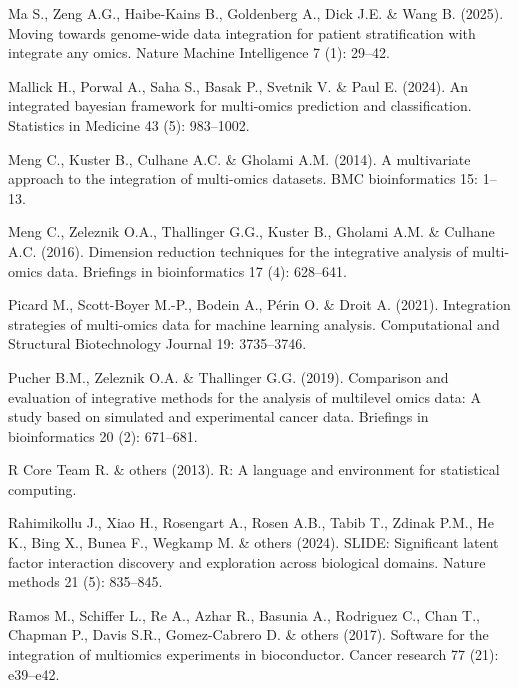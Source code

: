 \documentclass[
]{article}
\newlength{\cslhangindent}
\newlength{\cslentryspacingunit} %
\newenvironment{CSLReferences}[2] %
 {%
  \setlength{\parindent}{0pt}
  \ifodd #1
  \let\oldpar\par
  \def\par{\hangindent=\cslhangindent\oldpar}
  \fi
  \setlength{\parskip}{#2\cslentryspacingunit}
 }%
 {}
\begin{document}
\begin{CSLReferences}{1}{0}
\leavevmode{}%
Ma S., Zeng A.G., Haibe-Kains B., Goldenberg A., Dick J.E. \& Wang B. (2025). Moving towards genome-wide data integration for patient stratification with integrate any omics. Nature Machine Intelligence 7 (1): 29--42.

\leavevmode{}%
Mallick H., Porwal A., Saha S., Basak P., Svetnik V. \& Paul E. (2024). An integrated bayesian framework for multi-omics prediction and classification. Statistics in Medicine 43 (5): 983--1002.

\leavevmode{}%
Meng C., Kuster B., Culhane A.C. \& Gholami A.M. (2014). A multivariate approach to the integration of multi-omics datasets. BMC bioinformatics 15: 1--13.

\leavevmode{}%
Meng C., Zeleznik O.A., Thallinger G.G., Kuster B., Gholami A.M. \& Culhane A.C. (2016). Dimension reduction techniques for the integrative analysis of multi-omics data. Briefings in bioinformatics 17 (4): 628--641.

\leavevmode{}%
Picard M., Scott-Boyer M.-P., Bodein A., Périn O. \& Droit A. (2021). Integration strategies of multi-omics data for machine learning analysis. Computational and Structural Biotechnology Journal 19: 3735--3746.

\leavevmode{}%
Pucher B.M., Zeleznik O.A. \& Thallinger G.G. (2019). Comparison and evaluation of integrative methods for the analysis of multilevel omics data: A study based on simulated and experimental cancer data. Briefings in bioinformatics 20 (2): 671--681.

\leavevmode{}%
R Core Team R. \& others (2013). R: A language and environment for statistical computing.

\leavevmode{}%
Rahimikollu J., Xiao H., Rosengart A., Rosen A.B., Tabib T., Zdinak P.M., He K., Bing X., Bunea F., Wegkamp M. \& others (2024). SLIDE: Significant latent factor interaction discovery and exploration across biological domains. Nature methods 21 (5): 835--845.

\leavevmode{}%
Ramos M., Schiffer L., Re A., Azhar R., Basunia A., Rodriguez C., Chan T., Chapman P., Davis S.R., Gomez-Cabrero D. \& others (2017). Software for the integration of multiomics experiments in bioconductor. Cancer research 77 (21): e39--e42.


\end{CSLReferences}
\end{document}
